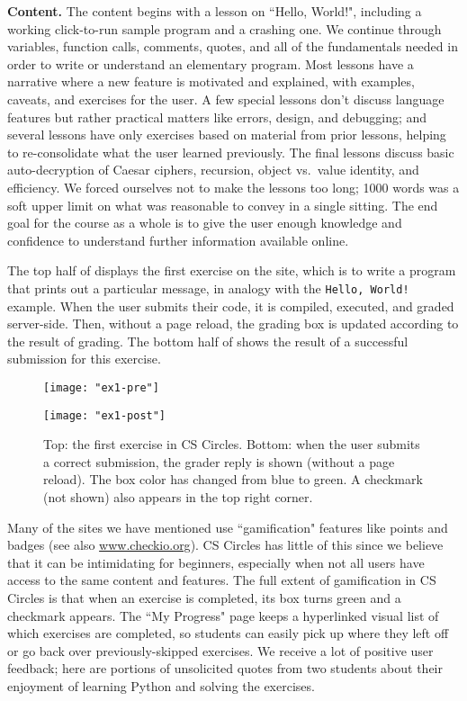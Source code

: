 \documentclass{article}
\begin{document}
{{\bf Content.} The content begins with a lesson on ``Hello, World!", including a working click-to-run sample program and a crashing one. We continue through variables, function calls, comments, quotes, and all of the fundamentals needed in order to write or understand an elementary program. Most lessons have a narrative where a new feature is motivated and explained, with examples, caveats, and exercises for the user. A few special lessons don't discuss language features but rather practical matters like errors, design, and debugging; and several lessons have only exercises based on material from prior lessons, helping to re-consolidate what the user learned previously. The final lessons discuss basic auto-decryption of Caesar ciphers, recursion, object vs.~value identity, and efficiency. We forced ourselves not to make the lessons too long; 1000 words was a soft upper limit on what was reasonable to convey in a single sitting. The end goal for the course as a whole is to give the user enough knowledge and confidence to understand further information available online. 

The top half of  displays the first exercise on the site, which is to write a program that prints out a particular message, in analogy with the {\tt Hello, World!} example. When the user submits their code, it is compiled, executed, and graded server-side. Then, without a page reload, the grading box is updated according to the result of grading. The bottom half of  shows the result of a successful submission for this exercise.

\begin{figure}[tb!]
\centering
\texttt{[image: "ex1-pre"]} \vspace{0em}

\texttt{[image: "ex1-post"]}
\caption{Top: the first exercise in CS Circles. Bottom: when the user submits a correct submission, the grader reply is shown (without a page reload). The box color has changed from blue to green. A checkmark (not shown) also appears in the top right corner.}\label{fig:hello}
\end{figure}

Many of the sites we have mentioned use ``gamification" features like points and badges (see also \url{www.checkio.org}). CS Circles has little of this since we believe that it can be intimidating for beginners, especially when not all users have access to the same content and features. The full extent of gamification in CS Circles is that when an exercise is completed, its box turns green and a checkmark appears. The ``My Progress" page keeps a hyperlinked visual list of which exercises are completed, so students can easily pick up where they left off or go back over previously-skipped exercises. We receive a lot of positive user feedback; here are portions of unsolicited quotes from two students about their enjoyment of learning Python and solving the exercises.

}
\end{document}
